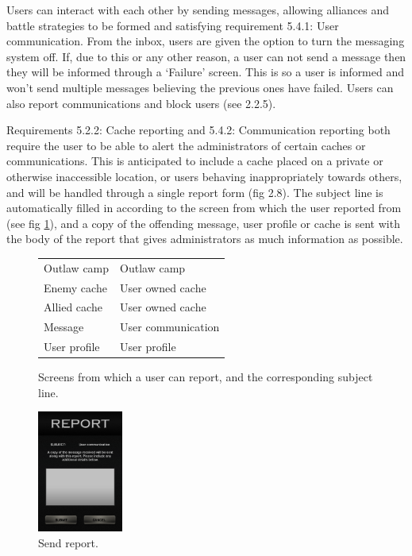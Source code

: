 Users can interact with each other by sending messages, allowing alliances and battle strategies to be formed and satisfying requirement 5.4.1: User communication. From the inbox, users are given the option to turn the messaging system off. If, due to this or any other reason, a user can not send a message then they will be informed through a `Failure' screen. This is so a user is informed and won't send multiple messages believing the previous ones have failed. Users can also report communications and block users (see 2.2.5).

Requirements 5.2.2: Cache reporting and 5.4.2: Communication reporting both require the user to be able to alert the administrators of certain caches or communications. This is anticipated to include a cache placed on a private or otherwise inaccessible location, or users behaving inappropriately towards others, and will be handled through a single report form (fig 2.8). The subject line is automatically filled in according to the screen from which the user reported from (see fig \ref{report_table}), and a copy of the offending message, user profile or cache is sent with the body of the report that gives administrators as much information as possible.

\begin{figure}[ht]
	\begin{minipage}{0.5\textwidth}
	\begin{tabularx}{\textwidth}{| X | X |}
		\hline
		Outlaw camp & Outlaw camp \\
		Enemy cache & User owned cache \\
		Allied cache & User owned cache \\
		Message & User communication \\
		User profile & User profile \\
		\hline
	\end{tabularx}
	\caption{Screens from which a user can report,
	and the corresponding subject line.}
	\label{report_table}
	\end{minipage}
\end{figure}

\begin{figure}
	\vspace{-180pt}
	\begin{center}
	\includegraphics[width=0.25\textwidth]{images/report_mockup}
	\caption{Send report.}
	\label{report_mockup}
	\end{center}
	\vspace{-60pt}
\end{figure}


